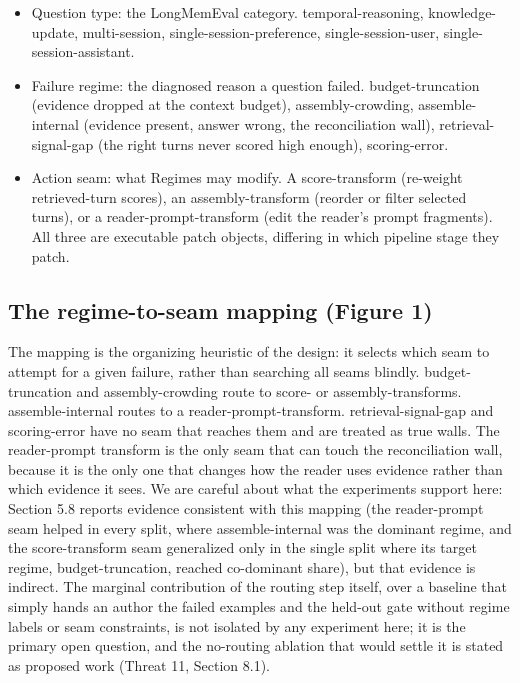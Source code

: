 \begin{itemize}
\item Question type: the LongMemEval category. temporal-reasoning, knowledge-update, multi-session, single-session-preference, single-session-user, single-session-assistant.
\item Failure regime: the diagnosed reason a question failed. budget-truncation (evidence dropped at the context budget), assembly-crowding, assemble-internal (evidence present, answer wrong, the reconciliation wall), retrieval-signal-gap (the right turns never scored high enough), scoring-error.
\item Action seam: what Regimes may modify. A score-transform (re-weight retrieved-turn scores), an assembly-transform (reorder or filter selected turns), or a reader-prompt-transform (edit the reader's prompt fragments). All three are executable patch objects, differing in which pipeline stage they patch.
\end{itemize}

\subsection{The regime-to-seam mapping (Figure 1)}

The mapping is the organizing heuristic of the design: it selects which seam to attempt for a given failure, rather than searching all seams blindly. budget-truncation and assembly-crowding route to score- or assembly-transforms. assemble-internal routes to a reader-prompt-transform. retrieval-signal-gap and scoring-error have no seam that reaches them and are treated as true walls. The reader-prompt transform is the only seam that can touch the reconciliation wall, because it is the only one that changes how the reader uses evidence rather than which evidence it sees. We are careful about what the experiments support here: Section 5.8 reports evidence consistent with this mapping (the reader-prompt seam helped in every split, where assemble-internal was the dominant regime, and the score-transform seam generalized only in the single split where its target regime, budget-truncation, reached co-dominant share), but that evidence is indirect. The marginal contribution of the routing step itself, over a baseline that simply hands an author the failed examples and the held-out gate without regime labels or seam constraints, is not isolated by any experiment here; it is the primary open question, and the no-routing ablation that would settle it is stated as proposed work (Threat 11, Section 8.1).


